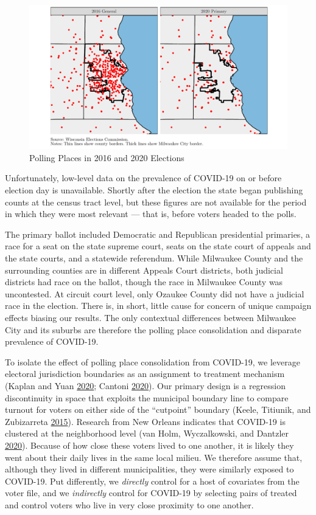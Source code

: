 \documentclass[
  12pt,
]{article}
\begin{document}
\begin{figure}
\centering
\includegraphics{mke_turnout_files/figure-latex/map-1.pdf}
\caption{\label{fig:map}\label{fig:map}Polling Places in 2016 and 2020 Elections}
\end{figure}

Unfortunately, low-level data on the prevalence of COVID-19 on or before election day is unavailable. Shortly after the election the state began publishing counts at the census tract level, but these figures are not available for the period in which they were most relevant --- that is, before voters headed to the polls.

The primary ballot included Democratic and Republican presidential primaries, a race for a seat on the state supreme court, seats on the state court of appeals and the state courts, and a statewide referendum. While Milwaukee County and the surrounding counties are in different Appeals Court districts, both judicial districts had race on the ballot, though the race in Milwaukee County was uncontested. At circuit court level, only Ozaukee County did not have a judicial race in the election. There is, in short, little cause for concern of unique campaign effects biasing our results. The only contextual differences between Milwaukee City and its suburbs are therefore the polling place consolidation and disparate prevalence of COVID-19.

To isolate the effect of polling place consolidation from COVID-19, we leverage electoral jurisdiction boundaries as an assignment to treatment mechanism (Kaplan and Yuan \protect\hyperlink{ref-Kaplan2020}{2020}; Cantoni \protect\hyperlink{ref-Cantoni2020}{2020}). Our primary design is a regression discontinuity in space that exploits the municipal boundary line to compare turnout for voters on either side of the ``cutpoint'' boundary (Keele, Titiunik, and Zubizarreta \protect\hyperlink{ref-Keele2015}{2015}). Research from New Orleans indicates that COVID-19 is clustered at the neighborhood level (van Holm, Wyczalkowski, and Dantzler \protect\hyperlink{ref-vanHolm2020}{2020}). Because of how close these voters lived to one another, it is likely they went about their daily lives in the same local milieu. We therefore assume that, although they lived in different municipalities, they were similarly exposed to COVID-19. Put differently, we \emph{directly} control for a host of covariates from the voter file, and we \emph{indirectly} control for COVID-19 by selecting pairs of treated and control voters who live in very close proximity to one another.
\end{document}
